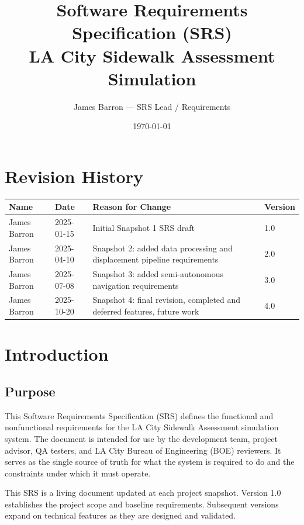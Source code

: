 \documentclass{article}
\title{Software Requirements Specification (SRS)\\
\large LA City Sidewalk Assessment Simulation}
\author{James Barron --- SRS Lead / Requirements}
\date{\today}
\begin{document}
\maketitle
\newpage
\tableofcontents
\newpage

\section{Revision History}

\begin{longtable}{|p{1.3in}|p{1in}|p{2.6in}|p{0.8in}|}
\hline
\textbf{Name} & \textbf{Date} & \textbf{Reason for Change} & \textbf{Version} \\
\hline
James Barron & 2025-01-15 & Initial Snapshot 1 SRS draft & 1.0 \\
\hline
James Barron & 2025-04-10 & Snapshot 2: added data processing and displacement pipeline requirements & 2.0 \\
\hline
James Barron & 2025-07-08 & Snapshot 3: added semi-autonomous navigation requirements & 3.0 \\
\hline
James Barron & 2025-10-20 & Snapshot 4: final revision, completed and deferred features, future work & 4.0 \\
\hline
\end{longtable}

\section{Introduction}

\subsection{Purpose}
This Software Requirements Specification (SRS) defines the functional and nonfunctional requirements
for the LA City Sidewalk Assessment simulation system. The document is intended for use by the
development team, project advisor, QA testers, and LA City Bureau of Engineering (BOE) reviewers.
It serves as the single source of truth for what the system is required to do and the constraints
under which it must operate.

This SRS is a living document updated at each project snapshot. Version 1.0 establishes the project
scope and baseline requirements. Subsequent versions expand on technical features as they are
designed and validated.
\end{document}
